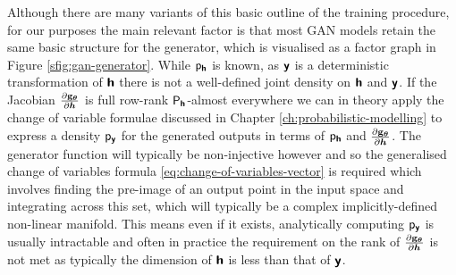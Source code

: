 Although there are many variants of this basic outline of the training procedure, for our purposes the main relevant factor is that most \ac{GAN} models retain the same basic structure for the generator, which is visualised as a factor graph in Figure \ref{sfig:gan-generator}. While $\mathsf{p}_{\boldsymbol{\mathsf{h}}}$ is known, as $\boldsymbol{\mathsf{y}}$ is a deterministic transformation of $\boldsymbol{\mathsf{h}}$ there is not a well-defined joint density on $\boldsymbol{\mathsf{h}}$ and $\boldsymbol{\mathsf{y}}$. If the Jacobian $\frac{\partial {\mathbf{g}}_{\boldsymbol{\theta}}}{\partial \boldsymbol{h}}$ is full row-rank $\mathsf{P}_{\boldsymbol{\mathsf{h}}}$-almost everywhere we can in theory apply the change of variable formulae discussed in Chapter \ref{ch:probabilistic-modelling} to express a density $\mathsf{p}_{\boldsymbol{\mathsf{y}}}$ for the generated outputs in terms of $\mathsf{p}_{\boldsymbol{\mathsf{h}}}$ and $\frac{\partial {\mathbf{g}}_{\boldsymbol{\theta}}}{\partial \boldsymbol{h}}$. The generator function will typically be non-injective however and so the generalised change of variables formula \eqref{eq:change-of-variables-vector} is required which involves finding the pre-image of an output point in the input space and integrating across this set, which will typically be a complex implicitly-defined non-linear manifold. This means even if it exists, analytically computing $\mathsf{p}_{\boldsymbol{\mathsf{y}}}$ is usually intractable and often in practice the requirement on the rank of $\frac{\partial {\mathbf{g}}_{\boldsymbol{\theta}}}{\partial \boldsymbol{h}}$ is not met as typically the dimension of $\boldsymbol{\mathsf{h}}$ is less than that of $\boldsymbol{\mathsf{y}}$.




